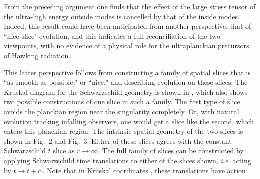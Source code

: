 
From the preceding argument one finds that the effect of the large stress tensor of the ultra-high energy outside modes is cancelled by that of the inside modes.  Indeed, this result could have been anticipated from another perspective, that of  ``nice slice" evolution, and this indicates a full reconciliation of the two viewpoints, with no evidence of a physical role for the ultraplanckian precursors of Hawking radiation.



This latter perspective follows from constructing a family of spatial slices that is ``as smooth as possible," or ``nice," and describing evolution on these slices.  The Kruskal diagram for the Schwarzschild geometry is shown in \Krusk, which also shows two possible constructions of one slice in such a family.  The first type of slice avoids the planckian region near the singularity completely.  Or, with natural evolution tracking infalling observers, one would get a slice like the second, which enters this planckian region.  The intrinsic spatial geometry of the two slices is shown in Fig.~2 and Fig.~3.  Either of these slices agrees with the constant Schwarzschild $t$ slice as $r\rightarrow\infty$.  The full family of slices can be constructed by applying Schwarzschild time translations to either of the slices shown, {\it i.e.} acting by $t\rightarrow t+\alpha$.  Note that in Kruskal coordinates \kruskdef, these translations have action
%
\eqn{}
%



